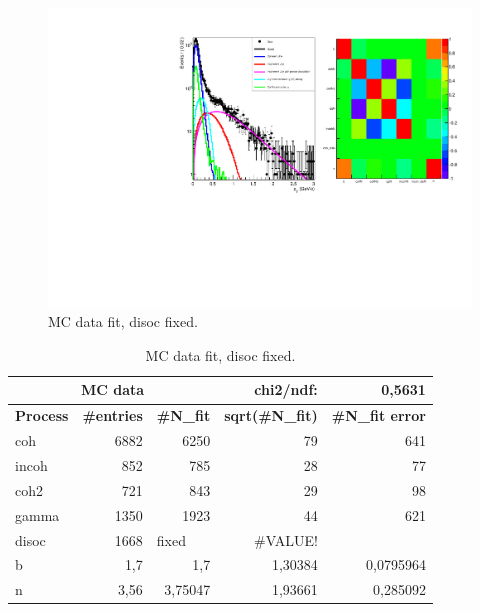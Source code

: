 \documentclass{beamer}
\begin{document}
\begin{frame}


\begin{figure}[!ht]
\centering
 {\includegraphics[width=\textwidth]{4Pt_fit.pdf}
\caption{MC data fit, disoc fixed.} 
\label{fig:}}
\end{figure}

\end{frame}
\begin{frame}

\begin{table}[bp]
\begin{center}
\begin{tabular}{|l|r|r|r|r|}
\hline
\multicolumn{3}{|c|}{\textbf{MC data}} & chi2/ndf: & 0,5631 \\ \hline
\textbf{Process} & \multicolumn{1}{l|}{\textbf{\#entries}} & \multicolumn{1}{l|}{\textbf{\#N\_fit}} & \multicolumn{1}{l|}{\textbf{sqrt(\#N\_fit)}} & \multicolumn{1}{l|}{\textbf{\#N\_fit error}} \\ \hline
coh & 6882 & 6250 & 79 & 641 \\ \hline
incoh & 852 & 785 & 28 & 77 \\ \hline
coh2 & 721 & 843 & 29 & 98 \\ \hline
gamma & 1350 & 1923 & 44 & 621 \\ \hline
disoc & 1668 & \multicolumn{1}{l|}{fixed} & \#VALUE! & \multicolumn{1}{l|}{} \\ \hline
b & 1,7 & 1,7 & 1,30384 & 0,0795964 \\ \hline
n & 3,56 & 3,75047 & 1,93661 & 0,285092 \\ \hline
\end{tabular}
\end{center}
\caption{MC data fit, disoc fixed.}
\label{}
\end{table}

\end{frame}
\end{document}
